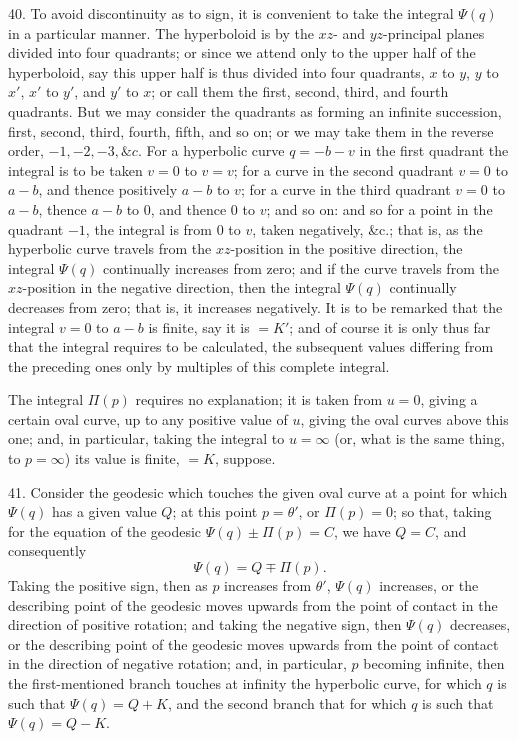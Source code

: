 \documentclass[11pt,a4paper]{article}
\begin{document}
40. To avoid discontinuity as to sign, it is convenient to take the integral $\Psi(q)$ in
a particular manner. The hyperboloid is by the $xz$- and $yz$-principal planes divided into
four quadrants; or since we attend only to the upper half of the hyperboloid, say this upper
half is thus divided into four quadrants, $x$ to $y$, $y$ to $x'$, $x'$ to $y'$, and $y'$ to
$x$; or call them the first, second, third, and fourth quadrants. But we may consider the
quadrants as forming an infinite succession, first, second, third, fourth, fifth, and so on;
or we may take them in the reverse order, $-1,-2,-3,\&c.$ For a hyperbolic curve
$q=-b-v$ in the first quadrant the integral is to be taken $v=0$ to $v=v$; for a curve in
the second quadrant $v=0$ to $a-b$, and thence positively $a-b$ to $v$; for a curve in the
third quadrant $v=0$ to $a-b$, thence $a-b$ to 0, and thence 0 to $v$; and so on: and so
for a point in the quadrant $-1$, the integral is from 0 to $v$, taken negatively, \&c.;
that is, as the hyperbolic curve travels from the $xz$-position in the positive direction,
the integral $\Psi(q)$ continually increases from zero; and if the curve travels from the
$xz$-position in the negative direction, then the integral $\Psi(q)$ continually decreases
from zero; that is, it increases negatively. It is to be remarked that the integral
$v=0$ to $a-b$ is finite, say it is $=K'$; and of course it is only thus far that the
integral requires to be calculated, the subsequent values differing from the preceding ones
only by multiples of this complete integral.

The integral $\Pi(p)$ requires no explanation; it is taken from $u=0$, giving a certain
oval curve, up to any positive value of $u$, giving the oval curves above this one; and, in
particular, taking the integral to $u=\infty$ (or, what is the same thing, to $p=\infty$)
its value is finite, $=K$, suppose.

41. Consider the geodesic which touches the given oval curve at a point for which $\Psi(q)$
has a given value $Q$; at this point $p=\theta'$, or $\Pi(p)=0$; so that, taking for the
equation of the geodesic $\Psi(q)\pm\Pi(p)=C$, we have $Q=C$, and consequently
\[
 \Psi(q)=Q\mp\Pi(p).
\]
Taking the positive sign, then as $p$ increases from $\theta'$, $\Psi(q)$ increases, or the
describing point of the geodesic moves upwards from the point of contact in the direction
of positive rotation; and taking the negative sign, then $\Psi(q)$ decreases, or the
describing point of the geodesic moves upwards from the point of contact in the direction
of negative rotation; and, in particular, $p$ becoming infinite, then the first-mentioned
branch touches at infinity the hyperbolic curve, for which $q$ is such that
$\Psi(q)=Q+K$, and the second branch that for which $q$ is such that $\Psi(q)=Q-K$.
\end{document}
